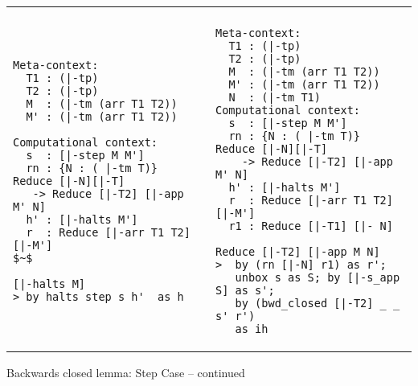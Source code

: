 \tightlistings
\centering

\newcommand{\cwidthOne}{0.33\textwidth}
\newcommand{\cwidthTwo}{0.33\textwidth}
\newcommand{\cwidthThree}{0.34\textwidth}

\newenvironment{eventable}{%
  \begin{tabular}{p{\cwidthOne}|p{\cwidthTwo}|p{\cwidthThree}}%
    }{%
  \end{tabular}
}




\begin{tabular}{p{6.4cm}|@{~}p{8cm}}
\step{bwd:halt} & \step{bwd:final}
 \tabularnewline

  \begin{lstlisting}
Meta-context:
  T1 : (|-tp)
  T2 : (|-tp)
  M  : (|-tm (arr T1 T2))
  M' : (|-tm (arr T1 T2))

Computational context:
  s  : [|-step M M']
  rn : {N : ( |-tm T)} Reduce [|-N][|-T]
   -> Reduce [|-T2] [|-app M' N]
  h' : [|-halts M']
  r  : Reduce [|-arr T1 T2][|-M']
$~$
\end{lstlisting}
\begin{lstlisting}
[|-halts M]
> by halts_step s h'  as h
  \end{lstlisting}

&

\begin{lstlisting}
Meta-context:
  T1 : (|-tp)
  T2 : (|-tp)
  M  : (|-tm (arr T1 T2))
  M' : (|-tm (arr T1 T2))
  N  : (|-tm T1)
Computational context:
  s  : [|-step M M']
  rn : {N : ( |-tm T)} Reduce [|-N][|-T]
    -> Reduce [|-T2] [|-app M' N]
  h' : [|-halts M']
  r  : Reduce [|-arr T1 T2][|-M']
  r1 : Reduce [|-T1] [|- N]
\end{lstlisting}
\begin{lstlisting}
Reduce [|-T2] [|-app M N]
>  by (rn [|-N] r1) as r';
   unbox s as S; by [|-s_app S] as s';
   by (bwd_closed [|-T2] _ _ s' r')
   as ih
\end{lstlisting}
\end{tabular}


\caption{Backwards closed lemma: Step Case -- continued}

\label{fig:bwd-closed-harpoon-step}

